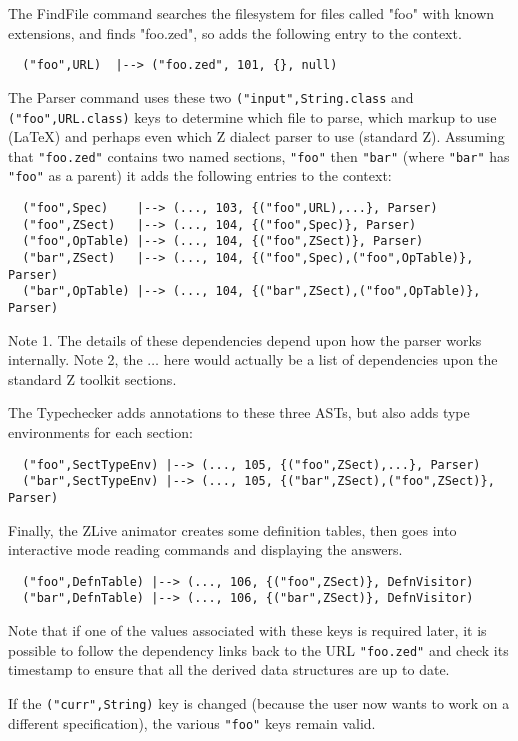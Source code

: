 \documentclass{llncs} %
\begin{document}
The FindFile command searches the filesystem for files called
"foo" with known extensions, and finds "foo.zed", so adds the
following entry to the context.
\begin{small}
\begin{verbatim}
  ("foo",URL)  |--> ("foo.zed", 101, {}, null)
\end{verbatim}
\end{small}

The Parser command uses these two \texttt{("input",String.class}
and \texttt{("foo",URL.class)} keys to determine which file
to parse, which markup to use (\LaTeX) and perhaps even which Z dialect
parser to use (standard Z).  Assuming that \texttt{"foo.zed"}
contains two named sections, \texttt{"foo"} then \texttt{"bar"}
(where \texttt{"bar"} has \texttt{"foo"} as a parent)
it adds the following entries to the context:
\begin{small}
\begin{verbatim}
  ("foo",Spec)    |--> (..., 103, {("foo",URL),...}, Parser)
  ("foo",ZSect)   |--> (..., 104, {("foo",Spec)}, Parser)
  ("foo",OpTable) |--> (..., 104, {("foo",ZSect)}, Parser)
  ("bar",ZSect)   |--> (..., 104, {("foo",Spec),("foo",OpTable)}, Parser)
  ("bar",OpTable) |--> (..., 104, {("bar",ZSect),("foo",OpTable)}, Parser)
\end{verbatim}
\end{small}
Note 1. The details of these dependencies depend upon how the
parser works internally.
Note 2, the $\ldots$ here would actually be a list of dependencies
upon the standard Z toolkit sections.

The Typechecker adds annotations to these three ASTs,
but also adds type environments for each section:
\begin{small}
\begin{verbatim}
  ("foo",SectTypeEnv) |--> (..., 105, {("foo",ZSect),...}, Parser)
  ("bar",SectTypeEnv) |--> (..., 105, {("bar",ZSect),("foo",ZSect)}, Parser)
\end{verbatim}
\end{small}

Finally, the ZLive animator creates some definition tables, then goes into
interactive mode reading commands and displaying the answers. 
\begin{small}
\begin{verbatim}
  ("foo",DefnTable) |--> (..., 106, {("foo",ZSect)}, DefnVisitor)
  ("bar",DefnTable) |--> (..., 106, {("bar",ZSect)}, DefnVisitor)
\end{verbatim}
\end{small}

Note that if one of the values associated with these keys is
required later, it is possible to follow the dependency links
back to the URL \texttt{"foo.zed"} and check its timestamp to
ensure that all the derived data structures are up to date.

If the \texttt{("curr",String)} key is changed (because the
user now wants to work on a different specification), the
various \texttt{"foo"} keys remain valid.



\end{document}
